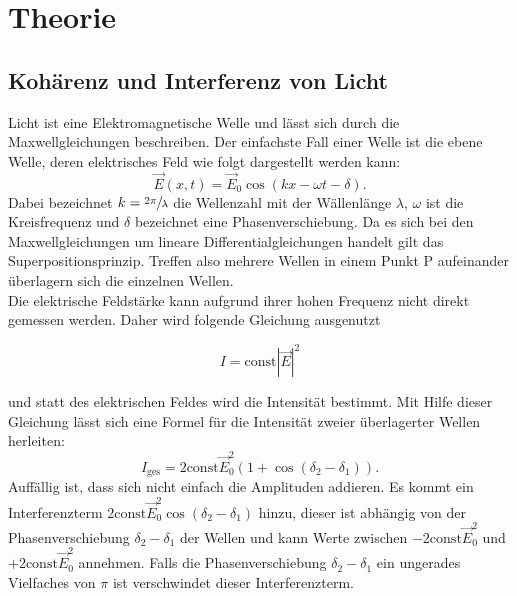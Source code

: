 
\section{Theorie}
\subsection{Kohärenz und Interferenz von Licht}
Licht ist eine Elektromagnetische Welle und lässt sich durch die Maxwellgleichungen
beschreiben. Der einfachste Fall einer Welle ist die ebene Welle, deren elektrisches Feld
wie folgt dargestellt werden kann:
\begin{equation}
  \vec{E}(x,t)=\vec{E}_{0}\cos(kx-\omega t -\delta)
  \label{eqn:eben}.
\end{equation}
Dabei bezeichnet $k=\sfrac{2\pi}{\lambda}$ die Wellenzahl mit der Wällenlänge $\lambda$,
$\omega$ ist die Kreisfrequenz und $\delta$ bezeichnet eine Phasenverschiebung.
Da es sich bei den Maxwellgleichungen um lineare Differentialgleichungen handelt
gilt das Superpositionsprinzip. Treffen also mehrere Wellen in einem Punkt P
aufeinander überlagern sich die einzelnen Wellen.\\
Die elektrische Feldstärke kann aufgrund ihrer hohen Frequenz %
nicht direkt gemessen werden. Daher wird folgende Gleichung ausgenutzt

\begin{equation}
  I=\text{const} |\vec{E}|^{2}
  \label{eqn:intensität}
\end{equation}

und statt des elektrischen Feldes wird die Intensität bestimmt.
\label{sec:Theorie}
Mit Hilfe dieser Gleichung lässt sich eine Formel für die Intensität zweier
überlagerter Wellen herleiten:
\begin{equation}
  I_{\text{ges}}=2\text{const}\vec{E}_{0}^{2}(1+\cos{(\delta_{2}-\delta_{1})})
  \label{eqn:iges}.
\end{equation}
Auffällig ist, dass sich nicht einfach die Amplituden addieren. Es kommt ein Interferenzterm
$2\text{const}\vec{E}_{0}^{2}\cos{(\delta_{2}-\delta_{1})}$ hinzu, dieser ist abhängig von
der Phasenverschiebung $\delta_{2}-\delta_{1}$ der Wellen und kann Werte zwischen
$-2\text{const}\vec{E}_{0}^{2}$ und $+2\text{const}\vec{E}_{0}^{2}$ annehmen.
Falls die Phasenverschiebung $\delta_{2}-\delta_{1}$ ein ungerades Vielfaches von
$\pi$ ist verschwindet dieser Interferenzterm.\\

